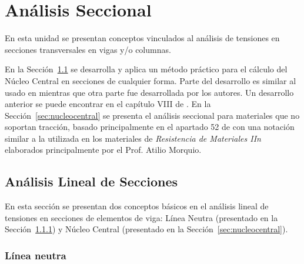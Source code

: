%
%
%

\chapter{Análisis Seccional}

En esta unidad se presentan conceptos vinculados al análisis de tensiones en secciones transversales en vigas y/o columnas. %

En la Sección~\ref{sec:lnnc} se desarrolla y aplica un método práctico para el cálculo del Núcleo Central en secciones de cualquier forma. %
%
Parte del desarrollo es similar al usado en \citep{massood2001} mientras que otra parte fue desarrollada por los autores. %
%
Un desarrollo anterior se puede encontrar en el capítulo VIII de \citep{Timoshenko1953}. %
%
En la Sección~\ref{sec:nucleocentral} se presenta el análisis seccional para materiales que no soportan tracción, basado principalmente en el apartado 52 de \citep{Timoshenko1953} con una notación similar a la utilizada en los materiales de \textit{Resistencia de Materiales IIn} elaborados principalmente por el Prof. Atilio Morquio.

\section{Análisis Lineal de Secciones} \label{sec:lnnc}

En esta sección se presentan dos conceptos básicos en el análisis lineal de tensiones en secciones de elementos de viga: Línea Neutra (presentado en la Sección~\ref{sec:lineaneutra}) y Núcleo Central (presentado en la Sección~\ref{sec:nucleocentral}).

\subsection{Línea neutra} \label{sec:lineaneutra}

